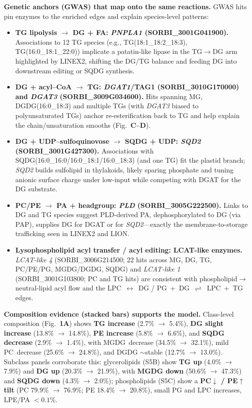 \documentclass[10pt,letterpaper]{article}
\begin{document}
\begin{itemize}
\noindent \textbf{Genetic anchors (GWAS) that map onto the same reactions.}
GWAS hits pin enzymes to the enriched edges and explain species-level patterns:
\begin{itemize}\itemsep3pt
  \item \textbf{TG lipolysis $\rightarrow$ DG + FA: \textit{PNPLA1} (SORBI\_3001G041900).} Associations to 12 TG species (e.g., TG(18:1\_18:2\_18:3), TG(16:0\_18:1\_22:0)) implicate a patatin-like lipase in the TG$\rightarrow$DG arm highlighted by LINEX2, shifting the DG/TG balance and feeding DG into downstream editing or SQDG synthesis.
  \item \textbf{DG + acyl–CoA $\rightarrow$ TG: \textit{DGAT1}/TAG1 (SORBI\_3010G170000) and \textit{DGAT3} (SORBI\_3009G034600).} Hits spanning MG, DGDG(16:0\_18:3) and multiple TGs (with \textit{DGAT3} biased to polyunsaturated TGs) anchor re-esterification back to TG and help explain the chain/unsaturation smooths (Fig.\ \textbf{C–D}).
  \item \textbf{DG + UDP–sulfoquinovose $\rightarrow$ SQDG + UDP: \textit{SQD2} (SORBI\_3001G427300).} Associations with SQDG(16:0\_16:0/16:0\_18:1/16:0\_18:3) (and one TG) fit the plastid branch; \textit{SQD2} builds sulfolipid in thylakoids, likely sparing phosphate and tuning anionic surface charge under low-input while competing with DGAT for the DG substrate.
  \item \textbf{PC/PE $\rightarrow$ PA + headgroup: \textit{PLD} (SORBI\_3005G222500).} Links to DG and TG species suggest PLD-derived PA, dephosphorylated to DG (via PAP), supplies DG for DGAT or for \textit{SQD2}—exactly the membrane-to-storage trafficking seen in LINEX2 and LION.
  \item \textbf{Lysophospholipid acyl transfer / acyl editing: LCAT-like enzymes.} 
  \textit{LCAT-like 4} (SORBI\_3006G214500; 22 hits across MG, DG, TG, PC/PE/PG, MGDG/DGDG, SQDG) and \textit{LCAT-like 1} (SORBI\_3001G103800; PC and TG hits) are consistent with phospholipid$\rightarrow$neutral-lipid acyl flow and the \mbox{LPC $\leftrightarrow$ DG} / \mbox{PG + DG $\rightleftharpoons$ LPC + TG} edges.
\end{itemize}

\noindent \textbf{Composition evidence (stacked bars) supports the model.}
Class-level composition (Fig.\ \textbf{1A}) shows \textbf{TG increase} (2.7\% $\rightarrow$ 5.4\%), \textbf{DG slight increase} (13.8\% $\rightarrow$ 14.8\%), \textbf{PE increase} (5.8\% $\rightarrow$ 6.6\%), and \textbf{SQDG decrease} (2.9\% $\rightarrow$ 1.4\%), with \mbox{MGDG decrease} (34.5\% $\rightarrow$ 32.1\%), mild \mbox{PC decrease} (25.6\% $\rightarrow$ 24.8\%), and DGDG $\sim$stable (12.7\% $\rightarrow$ 13.0\%). 
Subclass panels corroborate this: glycerolipids (S5B) show \textbf{TG up} (4.0\% $\rightarrow$ 7.9\%) and \textbf{DG up} (20.3\% $\rightarrow$ 21.9\%), with \textbf{MGDG down} (50.6\% $\rightarrow$ 47.3\%) and \textbf{SQDG down} (4.3\% $\rightarrow$ 2.0\%); phospholipids (S5C) show a \textbf{PC$\downarrow$ / PE$\uparrow$ tilt} (PC 79.9\% $\rightarrow$ 76.9\%; PE 18.4\% $\rightarrow$ 20.8\%), small PG and LPC increases, LPE/PA $<0.1\%$.


\end{itemize}
\end{document}
